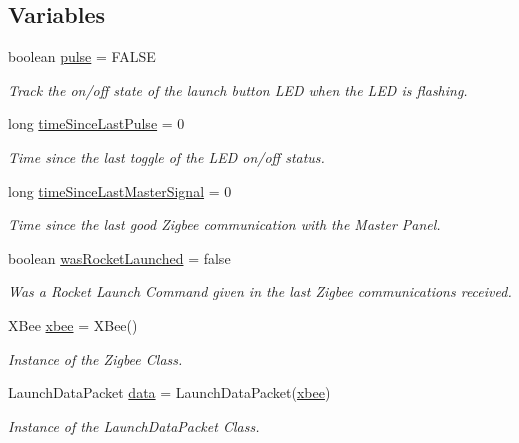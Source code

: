 \subsection*{\-Variables}
\begin{DoxyCompactItemize}
\item 
boolean \hyperlink{launchPad_8ino_a5583bd11885b1c22517a2478981867ca}{pulse} = \-F\-A\-L\-S\-E
\begin{DoxyCompactList}\small\item\em \-Track the on/off state of the launch button \-L\-E\-D when the \-L\-E\-D is flashing. \end{DoxyCompactList}\item 
long \hyperlink{launchPad_8ino_af8d9d76d18b6aee4b209d4f3b9f2d8d3}{time\-Since\-Last\-Pulse} = 0
\begin{DoxyCompactList}\small\item\em \-Time since the last toggle of the \-L\-E\-D on/off status. \end{DoxyCompactList}\item 
long \hyperlink{launchPad_8ino_a7b1a52e134926e2cf15a07a282da0357}{time\-Since\-Last\-Master\-Signal} = 0
\begin{DoxyCompactList}\small\item\em \-Time since the last good \-Zigbee communication with the \-Master \-Panel. \end{DoxyCompactList}\item 
boolean \hyperlink{launchPad_8ino_af8ca6213dcf51fb6a3a9453c59099449}{was\-Rocket\-Launched} = false
\begin{DoxyCompactList}\small\item\em \-Was a \-Rocket \-Launch \-Command given in the last \-Zigbee communications received. \end{DoxyCompactList}\item 
\-X\-Bee \hyperlink{launchPad_8ino_a18bbd7dece9ef587254b08710426fd17}{xbee} = \-X\-Bee()
\begin{DoxyCompactList}\small\item\em \-Instance of the \-Zigbee \-Class. \end{DoxyCompactList}\item 
\-Launch\-Data\-Packet \hyperlink{launchPad_8ino_a2581ee7316bbd0b2c1f26d7892d9383b}{data} = \-Launch\-Data\-Packet(\hyperlink{launchPad_8ino_a18bbd7dece9ef587254b08710426fd17}{xbee})
\begin{DoxyCompactList}\small\item\em \-Instance of the \-Launch\-Data\-Packet \-Class. \end{DoxyCompactList}\end{DoxyCompactItemize}


